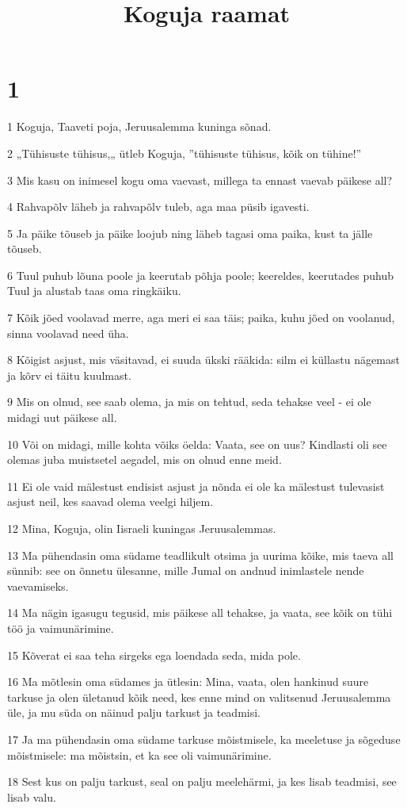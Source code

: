 

\title{Koguja raamat}

\chapter{1}

\par 1 Koguja, Taaveti poja, Jeruusalemma kuninga sõnad.
\par 2 „Tühisuste tühisus,„ ütleb Koguja, ”tühisuste tühisus, kõik on tühine!”
\par 3 Mis kasu on inimesel kogu oma vaevast, millega ta ennast vaevab päikese all?
\par 4 Rahvapõlv läheb ja rahvapõlv tuleb, aga maa püsib igavesti.
\par 5 Ja päike tõuseb ja päike loojub ning läheb tagasi oma paika, kust ta jälle tõuseb.
\par 6 Tuul puhub lõuna poole ja keerutab põhja poole; keereldes, keerutades puhub Tuul ja alustab taas oma ringkäiku.
\par 7 Kõik jõed voolavad merre, aga meri ei saa täis; paika, kuhu jõed on voolanud, sinna voolavad need üha.
\par 8 Kõigist asjust, mis väsitavad, ei suuda ükski rääkida: silm ei küllastu nägemast ja kõrv ei täitu kuulmast.
\par 9 Mis on olnud, see saab olema, ja mis on tehtud, seda tehakse veel - ei ole midagi uut päikese all.
\par 10 Või on midagi, mille kohta võiks öelda: Vaata, see on uus? Kindlasti oli see olemas juba muistsetel aegadel, mis on olnud enne meid.
\par 11 Ei ole vaid mälestust endisist asjust ja nõnda ei ole ka mälestust tulevasist asjust neil, kes saavad olema veelgi hiljem.
\par 12 Mina, Koguja, olin Iisraeli kuningas Jeruusalemmas.
\par 13 Ma pühendasin oma südame teadlikult otsima ja uurima kõike, mis taeva all sünnib: see on õnnetu ülesanne, mille Jumal on andnud inimlastele nende vaevamiseks.
\par 14 Ma nägin igasugu tegusid, mis päikese all tehakse, ja vaata, see kõik on tühi töö ja vaimunärimine.
\par 15 Kõverat ei saa teha sirgeks ega loendada seda, mida pole.
\par 16 Ma mõtlesin oma südames ja ütlesin: Mina, vaata, olen hankinud suure tarkuse ja olen ületanud kõik need, kes enne mind on valitsenud Jeruusalemma üle, ja mu süda on näinud palju tarkust ja teadmisi.
\par 17 Ja ma pühendasin oma südame tarkuse mõistmisele, ka meeletuse ja sõgeduse mõistmisele: ma mõistsin, et ka see oli vaimunärimine.
\par 18 Sest kus on palju tarkust, seal on palju meelehärmi, ja kes lisab teadmisi, see lisab valu.

